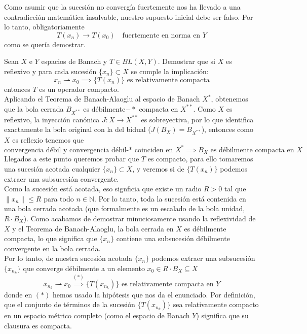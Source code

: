 \begin{ejercicio}
    \noindent
    Como asumir que la sucesión no convergía fuertemente nos ha llevado a una contradicción matemática insalvable, nuestro supuesto inicial debe ser falso. Por lo tanto, obligatoriamente
    $$ T(x_n) \longrightarrow T(x_0) \quad \text{fuertemente en norma en } Y $$
    como se quería demostrar.
\end{ejercicio}



\begin{ejercicio}
    Sean $X$ e $Y$ espacios de Banach y $T \in BL(X,Y)$. Demostrar que si $X$ es reflexivo y para cada sucesión $\{x_n\} \subset X$ se cumple la implicación:
    \[ x_n \rightharpoonup x_0 \implies \{T(x_n)\} \text{ es relativamente compacta} \]
    entonces $T$ es un operador compacto. \\

    \noindent
    Aplicando el Teorema de Banach-Alaoglu al espacio de Banach $X^*$, obtenemos que la bola cerrada $B_{X^{**}}$ es débilmente$-*$ compacta en $X^{**}$. Como $X$ es reflexivo, la inyección canónica $J: X \to X^{**}$ es sobreyectiva, por lo que identifica exactamente la bola original con la del bidual ($J(B_X) = B_{X^{**}}$), entonces como $X$ es reflexio tenemos que
    \begin{equation*}
        \text{convergencia débil y convergencia débil-* coinciden en } X^* \implies B_X \text{ es débilmente compacta en } X
    \end{equation*}
    Llegados a este punto queremos probar que $T$ es compacto, para ello tomaremos una sucesión acotada cualquier $\{x_n\} \subset X$, y veremos si de $\{T(x_n)\}$ podemos extraer una subsucesión convergente. \\

    \noindent
    Como la sucesión está acotada, eso signficia que existe un radio $R > 0$ tal que $\|x_n\| \le R$ para todo $n \in \mathbb{N}$. Por lo tanto, toda la sucesión está contenida en una bola cerrada acotada (que formalmente es un escalado de la bola unidad, $R \cdot B_X$). Como acabamos de demostrar minuciosamente usando la reflexividad de $X$ y el Teorema de Banach-Alaoglu, la bola cerrada en $X$ es débilmente compacta, lo que significa que $\{x_n\}$ contiene una subsucesión débilmente convergente en la bola cerrada. \\

    \noindent
    Por lo tanto, de nuestra sucesión acotada $\{x_n\}$ podemos extraer una subsucesión $\{x_{n_k}\}$ que converge débilmente a un elemento $x_0 \in R\cdot B_X\subseteq X$
    $$ x_{n_k} \rightharpoonup x_0 \overset{(*)}{\implies} \{T(x_{n_k})\} \text{ es relativamente compacta en } Y$$
    donde en $(*)$ hemos usado la hipótesis que nos da el enunciado. Por definición, que el conjunto de términos de la sucesión $\{T(x_{n_k})\}$ sea relativamente compacto en un espacio métrico completo (como el espacio de Banach $Y$) significa que su clausura es compacta. \\ 


\end{ejercicio}

